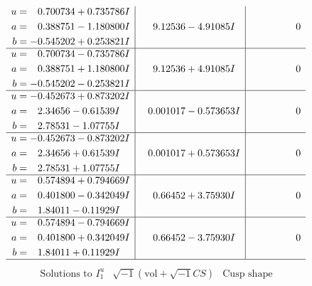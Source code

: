 \documentclass[1p]{elsarticle_modified}
\theoremstyle{definition}
\newcommand{\I}{\sqrt{-1}}
\begin{document}
$$\begin{array}{c|c|c}
\begin{aligned}
u &= \phantom{-}0.700734 + 0.735786 I \\
a &= \phantom{-}0.388751 - 1.180800 I \\
b &= -0.545202 + 0.253821 I\end{aligned}
 & \phantom{-}9.12536 - 4.91085 I & \phantom{-0.000000 } 0 \\ \hline\begin{aligned}
u &= \phantom{-}0.700734 - 0.735786 I \\
a &= \phantom{-}0.388751 + 1.180800 I \\
b &= -0.545202 - 0.253821 I\end{aligned}
 & \phantom{-}9.12536 + 4.91085 I & \phantom{-0.000000 } 0 \\ \hline\begin{aligned}
u &= -0.452673 + 0.873202 I \\
a &= \phantom{-}2.34656 - 0.61539 I \\
b &= \phantom{-}2.78531 - 1.07755 I\end{aligned}
 & \phantom{-}0.001017 - 0.573653 I & \phantom{-0.000000 } 0 \\ \hline\begin{aligned}
u &= -0.452673 - 0.873202 I \\
a &= \phantom{-}2.34656 + 0.61539 I \\
b &= \phantom{-}2.78531 + 1.07755 I\end{aligned}
 & \phantom{-}0.001017 + 0.573653 I & \phantom{-0.000000 } 0 \\ \hline\begin{aligned}
u &= \phantom{-}0.574894 + 0.794669 I \\
a &= \phantom{-}0.401800 - 0.342049 I \\
b &= \phantom{-}1.84011 - 0.11929 I\end{aligned}
 & \phantom{-}0.66452 + 3.75930 I & \phantom{-0.000000 } 0 \\ \hline\begin{aligned}
u &= \phantom{-}0.574894 - 0.794669 I \\
a &= \phantom{-}0.401800 + 0.342049 I \\
b &= \phantom{-}1.84011 + 0.11929 I\end{aligned}
 & \phantom{-}0.66452 - 3.75930 I & \phantom{-0.000000 } 0\\
 \hline 
 \end{array}$$\newpage$$\begin{array}{c|c|c}  
\text{Solutions to }I^u_{1}& \I (\text{vol} + \sqrt{-1}CS) & \text{Cusp shape}\\

\end{array}$$
\end{document}
